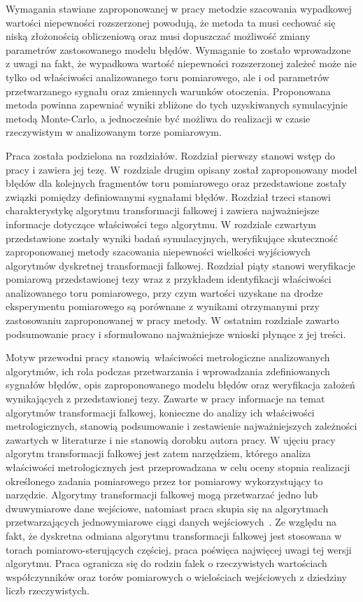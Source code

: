 Wymagania stawiane zaproponowanej w pracy metodzie szacowania wypadkowej wartości niepewności rozszerzonej powodują, że metoda ta musi cechować się niską złożonością obliczeniową oraz musi dopuszczać możliwość zmiany parametrów zastosowanego modelu błędów. Wymaganie to zostało wprowadzone z uwagi na fakt, że wypadkowa wartość niepewności rozszerzonej zależeć może nie tylko od właściwości analizowanego toru pomiarowego, ale i od parametrów przetwarzanego sygnału oraz zmiennych warunków otoczenia. Proponowana metoda powinna zapewniać wyniki zbliżone do tych uzyskiwanych symulacyjnie metodą Monte-Carlo, a jednocześnie być możliwa do realizacji w czasie rzeczywistym w analizowanym torze pomiarowym.

Praca została podzielona na  rozdziałów. Rozdział pierwszy stanowi wstęp do pracy i zawiera jej tezę. W rozdziale drugim opisany został zaproponowany model błędów dla kolejnych fragmentów toru pomiarowego oraz przedstawione zostały związki pomiędzy definiowanymi sygnałami błędów. Rozdział trzeci stanowi charakterystykę algorytmu transformacji falkowej i zawiera najważniejsze informacje dotyczące właściwości tego algorytmu. W rozdziale czwartym przedstawione zostały wyniki badań symulacyjnych, weryfikujące skuteczność zaproponowanej metody szacowania niepewności wielkości wyjściowych algorytmów dyskretnej transformacji falkowej. Rozdział piąty stanowi weryfikacje pomiarową przedstawionej tezy wraz z przykładem identyfikacji właściwości analizowanego toru pomiarowego, przy czym wartości uzyskane na drodze eksperymentu pomiarowego są porównane z wynikami otrzymanymi przy zastosowaniu zaproponowanej w pracy metody. W ostatnim rozdziale zawarto podsumowanie pracy i sformułowano najważniejsze wnioski płynące z jej treści.

Motyw przewodni pracy stanowią właściwości metrologiczne analizowanych algorytmów, ich rola podczas przetwarzania i wprowadzania zdefiniowanych sygnałów błędów, opis zaproponowanego modelu błędów oraz weryfikacja założeń wynikających z przedstawionej tezy. Zawarte w pracy informacje na temat algorytmów transformacji falkowej, konieczne do analizy ich właściwości metrologicznych, stanowią podsumowanie i zestawienie najważniejszych zależności zawartych w literaturze i nie stanowią dorobku autora pracy. W ujęciu pracy algorytm transformacji falkowej jest zatem narzędziem, którego analiza właściwości metrologicznych jest przeprowadzana w celu oceny stopnia realizacji określonego zadania pomiarowego przez tor pomiarowy wykorzystujący to narzędzie. Algorytmy transformacji falkowej mogą przetwarzać jedno lub dwuwymiarowe dane wejściowe, natomiast praca skupia się na algorytmach przetwarzających jednowymiarowe ciągi danych wejściowych~\cite{wallen_handbook}. Ze względu na fakt, że dyskretna odmiana algorytmu transformacji falkowej jest stosowana w torach pomiarowo-sterujących częściej, praca poświęca najwięcej uwagi tej wersji algorytmu. Praca ogranicza się do rodzin falek o rzeczywistych wartościach współczynników oraz torów pomiarowych o wielościach wejściowych z dziedziny liczb rzeczywistych.

